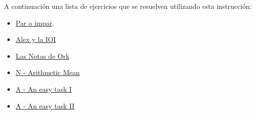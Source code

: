 A continuación una lista de ejercicios que se resuelven utilizando esta instrucción:

\begin{itemize}
	\item \href{https://dmoj.uclv.edu.cu/problem/evenodd} {Par o impar}.
	\item \href{https://dmoj.uclv.edu.cu/problem/alexandioi} {Alex y la IOI}
	\item \href{https://dmoj.uclv.edu.cu/problem/notasork} {Las Notas de Ork}
	\item \href{https://matcomgrader.com/problem/9661/arithmetic-mean/}{N - Arithmetic Mean}
	\item \href{https://matcomgrader.com/problem/9585/an-easy-task-i/}{A - An easy task I}
	\item \href{https://matcomgrader.com/problem/9587/an-easy-task-ii/}{A - An easy task II}
\end{itemize}